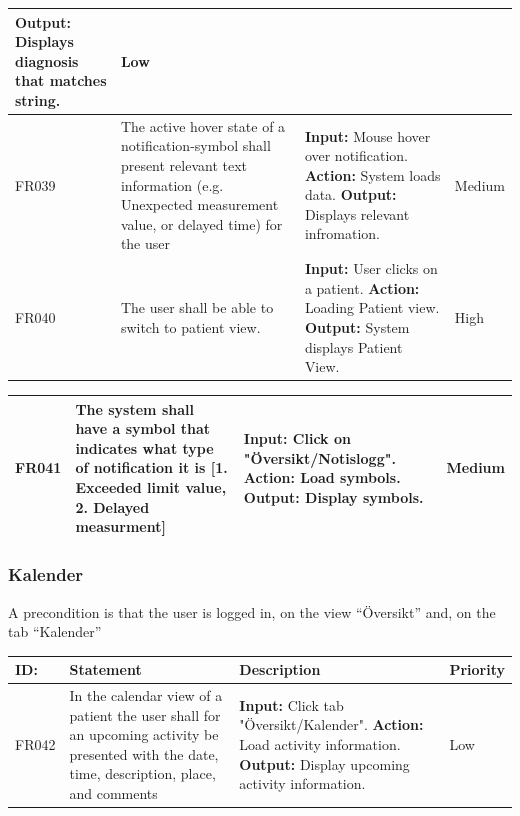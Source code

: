 \documentclass{scrreprt}
\begin{document}
\begin{center}
\begin{tabularx}{\linewidth}{| l | X | X | l |}
\newline \textbf{Output:} Displays diagnosis that matches string. & Low \\
\hline
FR039 & The active hover state of a notification-symbol shall present relevant text information (e.g. Unexpected measurement value, or delayed time) for the user   & \textbf{Input:} Mouse hover over notification.
\newline \textbf{Action:} System loads data.
\newline \textbf{Output:} Displays relevant infromation. & Medium \\ 
\hline
FR040 & The user shall be able to switch to patient view. & \textbf{Input:} User clicks on a patient.
\newline \textbf{Action:} Loading Patient view.
\newline \textbf{Output:} System displays Patient View. & High \\ 
\hline
\end{tabularx}
\begin{tabularx}{\linewidth}{| l | X | X | l |}
\hline
FR041 & The system shall have a symbol that indicates what type of notification it is [1. Exceeded limit value, 2. Delayed measurment] & \textbf{Input:} Click on "Översikt/Notislogg".
\newline \textbf{Action:} Load symbols.
\newline \textbf{Output:} Display symbols. & Medium \\ 
\hline
\end{tabularx}
\end{center}

\subsubsection{Kalender}
A precondition is that the user is logged in, on the view “Översikt” and, on the tab “Kalender”
\begin{center}
\begin{tabularx}{\linewidth}{| l | X | X | l |}
\hline
\textbf{ID:} & \textbf{Statement} & \textbf{Description} & \textbf{Priority} \\ 
\hline
FR042 & In the calendar view of a patient the user shall for an upcoming activity be presented with the date, time, description, place, and comments & \textbf{Input:} Click tab "Översikt/Kalender".
\newline \textbf{Action:} Load activity information.
\newline \textbf{Output:} Display upcoming  activity information. & Low \\ 
\hline
\end{tabularx}
\end{center}
\end{document}
